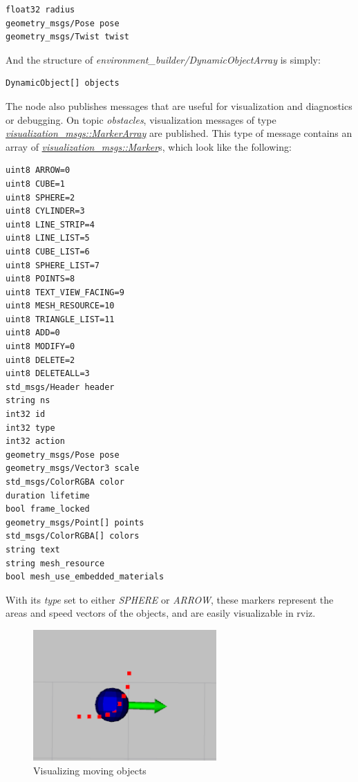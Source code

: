 \begin{minipage}{\textwidth}
\begin{lstlisting}[language=IDL]
float32 radius
geometry_msgs/Pose pose
geometry_msgs/Twist twist
\end{lstlisting}
\end{minipage}

And the structure of \textit{environment\_builder/DynamicObjectArray} is simply:

\begin{lstlisting}[language=IDL]
DynamicObject[] objects
\end{lstlisting}

The node also publishes messages that are useful for visualization and diagnostics or debugging. On topic \textit{obstacles}, visualization messages of type \href{http://docs.ros.org/melodic/api/visualization_msgs/html/msg/MarkerArray.html}{\textit{visualization\_msgs::MarkerArray}} are published. This type of message contains an array of \href{http://docs.ros.org/melodic/api/visualization_msgs/html/msg/Marker.html}{\textit{visualization\_msgs::Marker}}s, which look like the following:

\begin{minipage}{\textwidth}
\begin{lstlisting}[language=IDL]
uint8 ARROW=0
uint8 CUBE=1
uint8 SPHERE=2
uint8 CYLINDER=3
uint8 LINE_STRIP=4
uint8 LINE_LIST=5
uint8 CUBE_LIST=6
uint8 SPHERE_LIST=7
uint8 POINTS=8
uint8 TEXT_VIEW_FACING=9
uint8 MESH_RESOURCE=10
uint8 TRIANGLE_LIST=11
uint8 ADD=0
uint8 MODIFY=0
uint8 DELETE=2
uint8 DELETEALL=3
std_msgs/Header header
string ns
int32 id
int32 type
int32 action
geometry_msgs/Pose pose
geometry_msgs/Vector3 scale
std_msgs/ColorRGBA color
duration lifetime
bool frame_locked
geometry_msgs/Point[] points
std_msgs/ColorRGBA[] colors
string text
string mesh_resource
bool mesh_use_embedded_materials
\end{lstlisting}
\end{minipage}

With its \textit{type} set to either \textit{SPHERE} or \textit{ARROW}, these markers represent the areas and speed vectors of the objects, and are easily visualizable in rviz.

\begin{figure}[!ht]
    \centering
    \includegraphics[height=50mm]{figures/raw/rviz_moving_object.png}
    \caption{Visualizing moving objects}
    \label{rviz_moving_object}
\end{figure}

